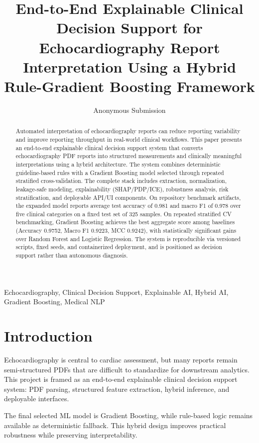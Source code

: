 \documentclass[10pt,twocolumn,letterpaper]{IEEEtran}
\title{End-to-End Explainable Clinical Decision Support for Echocardiography Report Interpretation Using a Hybrid Rule-Gradient Boosting Framework}
\author{Anonymous Submission}
\begin{document}
\maketitle

\begin{abstract}
Automated interpretation of echocardiography reports can reduce reporting variability and improve reporting throughput in real-world clinical workflows. This paper presents an end-to-end explainable clinical decision support system that converts echocardiography PDF reports into structured measurements and clinically meaningful interpretations using a hybrid architecture. The system combines deterministic guideline-based rules with a Gradient Boosting model selected through repeated stratified cross-validation. The complete stack includes extraction, normalization, leakage-safe modeling, explainability (SHAP/PDP/ICE), robustness analysis, risk stratification, and deployable API/UI components. On repository benchmark artifacts, the expanded model reports average test accuracy of 0.981 and macro F1 of 0.978 over five clinical categories on a fixed test set of 325 samples. On repeated stratified CV benchmarking, Gradient Boosting achieves the best aggregate score among baselines (Accuracy 0.9752, Macro F1 0.9223, MCC 0.9242), with statistically significant gains over Random Forest and Logistic Regression. The system is reproducible via versioned scripts, fixed seeds, and containerized deployment, and is positioned as decision support rather than autonomous diagnosis.
\end{abstract}

\begin{IEEEkeywords}
Echocardiography, Clinical Decision Support, Explainable AI, Hybrid AI, Gradient Boosting, Medical NLP
\end{IEEEkeywords}

\section{Introduction}
Echocardiography is central to cardiac assessment, but many reports remain semi-structured PDFs that are difficult to standardize for downstream analytics. This project is framed as an end-to-end explainable clinical decision support system: PDF parsing, structured feature extraction, hybrid inference, and deployable interfaces.

The final selected ML model is Gradient Boosting, while rule-based logic remains available as deterministic fallback. This hybrid design improves practical robustness while preserving interpretability.
\end{document}
